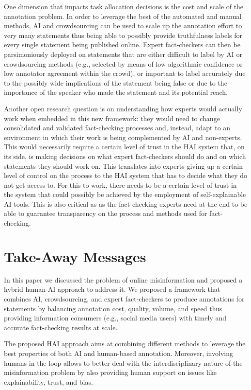 \documentclass[11pt]{article}
\begin{document}
One dimension that impacts  task allocation decisions is the cost and scale of the annotation problem. In order to leverage the best of the automated and manual methods, AI and crowdsourcing can be used to scale up the annotation effort to very many statements thus being able to possibly provide truthfulness labels for every single statement being published online. Expert fact-checkers can then be parsimoniously deployed on statements that are either difficult to label by AI or crowdsourcing methods (e.g., selected by means of low algorithmic confidence or low annotator agreement within the crowd), or important to label accurately due to the possibly wide implications of the statement being false or due to the importance of the speaker who made the statement and its potential reach.

Another open research question is on understanding how experts would actually work when embedded in this new framework: they would need to change consolidated and validated fact-checking processes and, instead,  adapt to an environment in which their work is being complemented by AI and non-experts. This would necessarily require a certain level of trust in the HAI system that, on its side, is making  decisions on what expert fact-checkers should do and on which statements they should work on. This translates into experts giving up a certain level of control on the process to the HAI system that has to decide what they do not get access to. 
For this to work, there needs to be a certain level of trust in the system that could possibly be achieved by the employment of self-explainable AI tools. This is also critical as as the fact-checking experts need at the end to be able to guarantee transparency on the process and methods used for fact-checking.




\section{Take-Away Messages}
\label{sec:take-away}

In this paper we discussed the problem of online misinformation and proposed a hybrid human-AI approach to address it.
% 
We proposed a framework that combines AI, crowdsourcing, and expert fact-checkers to produce annotations for statements by balancing annotation cost, quality, volume, and speed thus providing information consumers (e.g., social media users) with timely and accurate fact-checking results at scale.

The proposed HAI approach aims at combining different methods to leverage the best properties of both AI and human-based annotation. Moreover, involving humans in the loop allows to better deal with the interdisciplinary nature of the misinformation problem by also providing human support on issues like explainability, trust, and bias.
\end{document}
